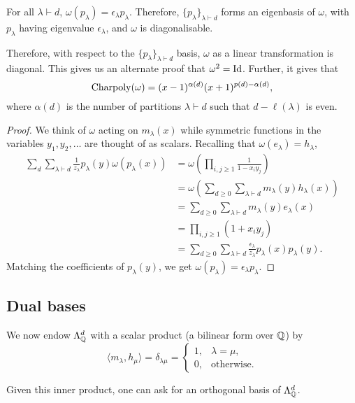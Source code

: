 	\begin{ftheo}
		\label{theo: p eigenbasis of omega}
		For all $\lambda \vdash d$, $\omega(p_\lambda) = \epsilon_\lambda p_\lambda$. Therefore, $\{p_\lambda\}_{\lambda \vdash d}$ forms an eigenbasis of $\omega$, with $p_\lambda$ having eigenvalue $\epsilon_\lambda$, and $\omega$ is diagonalisable.
	\end{ftheo}
	Therefore, with respect to the $\{p_\lambda\}_{\lambda \vdash d}$ basis, $\omega$ as a linear transformation is diagonal. This gives us an alternate proof that $\omega^2 = \operatorname{Id}$. Further, it gives that
	\[ \operatorname{Charpoly}(\omega) = (x-1)^{\alpha(d)} (x+1)^{p(d) - \alpha(d)}, \]
	where $\alpha(d)$ is the number of partitions $\lambda \vdash d$ such that $d - \ell(\lambda)$ is even.
	\begin{proof}
		We think of $\omega$ acting on $m_\lambda(x)$ while symmetric functions in the variables $y_1,y_2,\ldots$ are thought of as scalars. Recalling that $\omega(e_\lambda) = h_\lambda$,
		\begin{align*}
			\sum_{d}\sum_{\lambda \vdash d} \frac{1}{z_\lambda} p_\lambda(y) \omega(p_\lambda(x)) &= \omega \left( \prod_{i,j \ge 1} \frac{1}{1-x_iy_j} \right) \\
				&= \omega \left( \sum_{d \ge 0} \sum_{\lambda \vdash d} m_\lambda(y) h_\lambda(x) \right) \\
				&= \sum_{d \ge 0} \sum_{\lambda \vdash d} m_\lambda(y) e_\lambda(x) \\
				&= \prod_{i,j \ge 1} (1+x_iy_j) \\
				&= \sum_{d \ge 0} \sum_{\lambda \vdash d} \frac{\epsilon_\lambda}{z_\lambda} p_\lambda(x) p_\lambda(y).
		\end{align*}
		Matching the coefficients of $p_\lambda(y)$, we get $\omega(p_\lambda) = \epsilon_\lambda p_\lambda$.
	\end{proof}

\subsection{Dual bases}

	We now endow $\Lambda_{\mathbb{Q}}^d$ with a scalar product (a bilinear form over $\mathbb{Q}$) by
	\[ \langle m_\lambda , h_\mu \rangle = \delta_{\lambda\mu} = \begin{cases} 1, & \lambda = \mu, \\ 0, & \text{otherwise.} \end{cases} \]
	
	Given this inner product, one can ask for an orthogonal basis of $\Lambda_{\mathbb{Q}}^d$.

